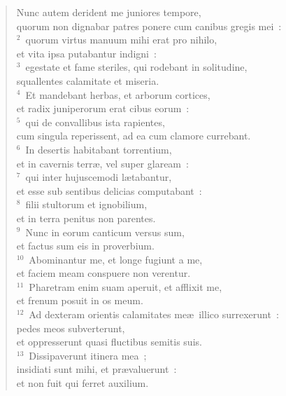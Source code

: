 \begin{flushleft}\begin{verse}\vspace{-19pt}\hspace{6pt}Nunc autem derident me juniores tempore,\\\hspace{6pt} quorum non dignabar patres ponere cum canibus gregis mei~:\\
${}^{2}$~quorum virtus manuum mihi erat pro nihilo,\\ et vita ipsa putabantur indigni~:\\
${}^{3}$~egestate et fame steriles, qui rodebant in solitudine,\\ squallentes calamitate et miseria.\\
${}^{4}$~Et mandebant herbas, et arborum cortices,\\ et radix juniperorum erat cibus eorum~:\\
${}^{5}$~qui de convallibus ista rapientes,\\ cum singula reperissent, ad ea cum clamore currebant.\\
${}^{6}$~In desertis habitabant torrentium,\\ et in cavernis terr\ae , vel super glaream~:\\
${}^{7}$~qui inter hujuscemodi l\ae tabantur,\\ et esse sub sentibus delicias computabant~:\\
${}^{8}$~filii stultorum et ignobilium,\\ et in terra penitus non parentes.\\
${}^{9}$~Nunc in eorum canticum versus sum,\\ et factus sum eis in proverbium.\\
${}^{10}$~Abominantur me, et longe fugiunt a me,\\ et faciem meam conspuere non verentur.\\
${}^{11}$~Pharetram enim suam aperuit, et afflixit me,\\ et frenum posuit in os meum.\\
${}^{12}$~Ad dexteram orientis calamitates me\ae\ illico surrexerunt~:\\ pedes meos subverterunt,\\ et oppresserunt quasi fluctibus semitis suis.\\
${}^{13}$~Dissipaverunt itinera mea~;\\ insidiati sunt mihi, et pr\ae valuerunt~:\\ et non fuit qui ferret auxilium.\\

\end{verse}
\end{flushleft}
